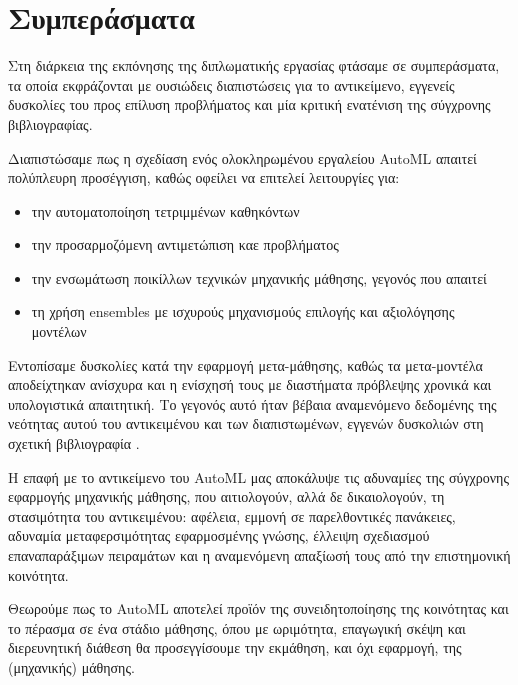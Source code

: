 \chapter{Συμπεράσματα}
Στη διάρκεια της εκπόνησης της διπλωματικής εργασίας φτάσαμε σε συμπεράσματα, τα οποία εκφράζονται με ουσιώδεις διαπιστώσεις για το αντικείμενο, εγγενείς δυσκολίες του προς επίλυση προβλήματος και μία κριτική ενατένιση της σύγχρονης βιβλιογραφίας.

Διαπιστώσαμε πως η σχεδίαση ενός ολοκληρωμένου εργαλείου \gls{AutoML} απαιτεί πολύπλευρη προσέγγιση, καθώς οφείλει να επιτελεί λειτουργίες για:
\begin{itemize}
	\item την αυτοματοποίηση τετριμμένων καθηκόντων
	\item την προσαρμοζόμενη αντιμετώπιση καε προβλήματος
	\item την ενσωμάτωση ποικίλλων τεχνικών μηχανικής μάθησης, γεγονός που απαιτεί 
	\item τη χρήση ensembles με ισχυρούς μηχανισμούς επιλογής και αξιολόγησης μοντέλων
\end{itemize}

Εντοπίσαμε δυσκολίες κατά την εφαρμογή μετα-μάθησης, καθώς τα μετα-μοντέλα αποδείχτηκαν ανίσχυρα και η ενίσχησή τους με διαστήματα πρόβλεψης χρονικά και υπολογιστικά απαιτητική. Το γεγονός αυτό ήταν βέβαια αναμενόμενο δεδομένης της νεότητας αυτού του αντικειμένου και των διαπιστωμένων, εγγενών δυσκολιών στη σχετική βιβλιογραφία \citep{Feurer:2014:UMI:3015544.3015549, kuba2002exploiting, Soares2004}.

Η επαφή με το αντικείμενο του \gls{AutoML} μας αποκάλυψε τις αδυναμίες της σύγχρονης εφαρμογής μηχανικής μάθησης, που αιτιολογούν, αλλά δε δικαιολογούν, τη στασιμότητα του αντικειμένου: αφέλεια, εμμονή σε παρελθοντικές πανάκειες, αδυναμία μεταφερσιμότητας εφαρμοσμένης γνώσης, έλλειψη σχεδιασμού επαναπαράξιμων πειραμάτων και η αναμενόμενη απαξίωσή τους από την επιστημονική κοινότητα.

Θεωρούμε πως το \gls{AutoML} αποτελεί προϊόν της συνειδητοποίησης της κοινότητας και το πέρασμα σε ένα στάδιο μάθησης, όπου με ωριμότητα, επαγωγική σκέψη και διερευνητική διάθεση θα προσεγγίσουμε την εκμάθηση, και όχι εφαρμογή, της (μηχανικής) μάθησης.